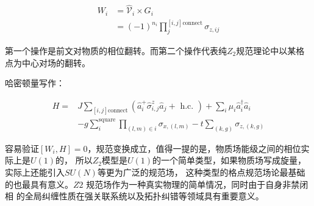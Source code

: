 \documentclass[a4paper]{article}
\begin{document}
$$
\begin{aligned}
    W_i &=  \hat{\mathcal{V}}_i \times G_i
    \\&= (-1)^{n_i} \prod_{j}^{[i,j]\text{connect}} \sigma_{z,ij}
\end{aligned}
$$

第一个操作是前文对物质的相位翻转。而第二个操作代表纯$Z_2$规范理论中以某格点为中心对场的翻转。

哈密顿量写作：

$$
\begin{aligned}
    H=&J \sum_{[i,j]\text{connect}}\left(\hat{a}_i^{+} \hat{\sigma}^z_{i, j}\hat{a}_j+\text { h.c. }\right)+\sum_i \mu_i \hat{a}_i^{\dagger} \hat{a}_i
    \\ &-g \sum_i^{\text{square}} \prod_{(l,m) \in i}  \sigma_{x,(l,m)} -t \sum_{(k,g)} \sigma_{z,(k,g)}    
\end{aligned}
$$

容易验证$[W_i,H] = 0$，规范变换成立，值得一提的是，物质场能级之间的相位实际上是$U(1)$的，
所以$Z_2$模型是$U(1)$的一个简单类型，如果物质场写成旋量，实际上还能引入$SU(N)$等更为广泛的规范场，
这种类型的格点规范场论最基础的也最具有意义。$Z2$ 规范场作为一种真实物理的简单情况，同时由于自身非禁闭相
的全局纠缠性质在强关联系统以及拓扑纠错等领域具有重要意义。
\end{document}
